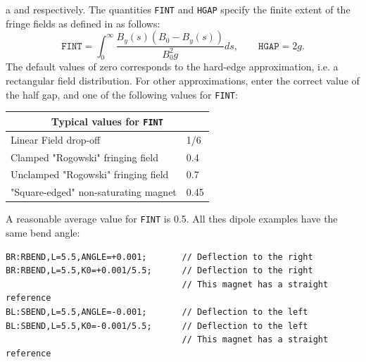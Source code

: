 a  and
 respectively.
The quantities \texttt{FINT} and \texttt{HGAP} specify
the finite extent of the fringe fields as defined in
as follows:
\[
\mathtt{FINT} = \int_0^\infty{\frac{B_y(s) (B_0 - B_y(s))}{B_0^2 g}}ds,\qquad
\mathtt{HGAP} = 2 g.
\]
The default values of zero corresponds to the hard-edge approximation,
i.e. a rectangular field distribution.
For other approximations, enter the correct value of the half gap,
and one of the following values for \texttt{FINT}:
\begin{center}
  \begin{tabular}{|l|l|}
    \hline
    \multicolumn{2}{|c|}{Typical values for \texttt{FINT}} \\
    \hline
    Linear Field drop-off                & 1/6  \\
    Clamped "Rogowski" fringing field    & 0.4  \\
    Unclamped "Rogowski" fringing field  & 0.7  \\
    "Square-edged" non-saturating magnet & 0.45 \\
    \hline
  \end{tabular}
\end{center}
A reasonable average value for \texttt{FINT} is 0.5.
All thes dipole examples have the same bend angle:
\begin{verbatim}
BR:RBEND,L=5.5,ANGLE=+0.001;       // Deflection to the right
BR:RBEND,L=5.5,K0=+0.001/5.5;      // Deflection to the right
                                   // This magnet has a straight reference
BL:SBEND,L=5.5,ANGLE=-0.001;       // Deflection to the left
BL:SBEND,L=5.5,K0=-0.001/5.5;      // Deflection to the left
                                   // This magnet has a straight reference
\end{verbatim}

